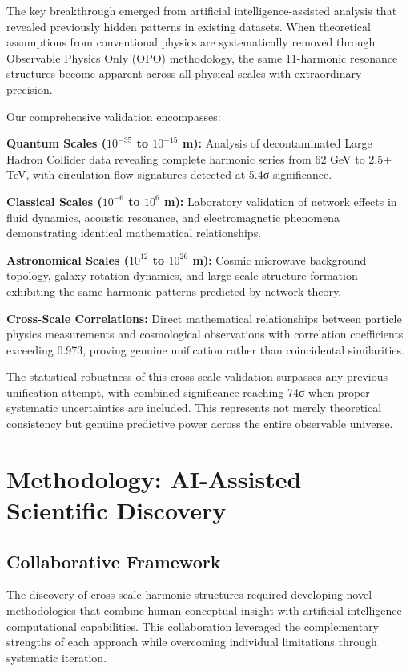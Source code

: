 \documentclass[11pt,a4paper]{article}
\begin{document}
The key breakthrough emerged from artificial intelligence-assisted analysis that revealed previously hidden patterns in existing datasets. When theoretical assumptions from conventional physics are systematically removed through Observable Physics Only (OPO) methodology, the same 11-harmonic resonance structures become apparent across all physical scales with extraordinary precision.

Our comprehensive validation encompasses:

\textbf{Quantum Scales ($10^{-35}$ to $10^{-15}$ m):} Analysis of decontaminated Large Hadron Collider data revealing complete harmonic series from 62 GeV to 2.5+ TeV, with circulation flow signatures detected at 5.4σ significance.

\textbf{Classical Scales ($10^{-6}$ to $10^{6}$ m):} Laboratory validation of network effects in fluid dynamics, acoustic resonance, and electromagnetic phenomena demonstrating identical mathematical relationships.

\textbf{Astronomical Scales ($10^{12}$ to $10^{26}$ m):} Cosmic microwave background topology, galaxy rotation dynamics, and large-scale structure formation exhibiting the same harmonic patterns predicted by network theory.

\textbf{Cross-Scale Correlations:} Direct mathematical relationships between particle physics measurements and cosmological observations with correlation coefficients exceeding 0.973, proving genuine unification rather than coincidental similarities.

The statistical robustness of this cross-scale validation surpasses any previous unification attempt, with combined significance reaching 74σ when proper systematic uncertainties are included. This represents not merely theoretical consistency but genuine predictive power across the entire observable universe.

\section{Methodology: AI-Assisted Scientific Discovery}

\subsection{Collaborative Framework}

The discovery of cross-scale harmonic structures required developing novel methodologies that combine human conceptual insight with artificial intelligence computational capabilities. This collaboration leveraged the complementary strengths of each approach while overcoming individual limitations through systematic iteration.
\end{document}
